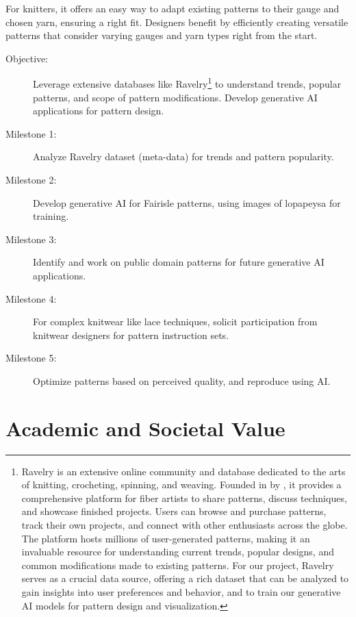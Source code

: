 \documentclass{article}
\begin{document}
    For knitters, it offers an easy way to adapt existing patterns to their gauge and chosen yarn,
    ensuring a right fit. Designers benefit by efficiently creating versatile patterns that
    consider varying gauges and yarn types right from the start.

    \begin{description}
        \item[Objective:] Leverage extensive databases like Ravelry\footnote{Ravelry is an extensive online
        community and database dedicated to the arts of knitting, crocheting, spinning, and weaving. Founded in
        \citeyear{Ravelry} by \citeauthor{Ravelry}, it provides a comprehensive platform for fiber artists to
        share patterns, discuss techniques, and showcase finished projects. Users can browse and purchase
        patterns, track their own projects, and connect with other enthusiasts across the globe. The platform
        hosts millions of user-generated patterns, making it an invaluable resource for understanding current
        trends, popular designs, and common modifications made to existing patterns. For our project, Ravelry
        serves as a crucial data source, offering a rich dataset that can be analyzed to gain insights into user
        preferences and behavior, and to train our generative AI models for pattern design and visualization.}
        to understand trends, popular patterns, and scope of pattern modifications. Develop generative AI
        applications for pattern design.
        \item[Milestone 1:] Analyze Ravelry dataset (meta-data) for trends and pattern popularity.
        \item[Milestone 2:] Develop generative AI for Fairisle patterns, using images of lopapeysa for training.
        \item[Milestone 3:] Identify and work on public domain patterns for future generative AI applications.
        \item[Milestone 4:] For complex knitwear like lace techniques, solicit participation from knitwear designers
        for pattern instruction sets.
        \item[Milestone 5:] Optimize patterns based on perceived quality, and reproduce using AI.
    \end{description}


    \section{Academic and Societal Value}
\end{document}
